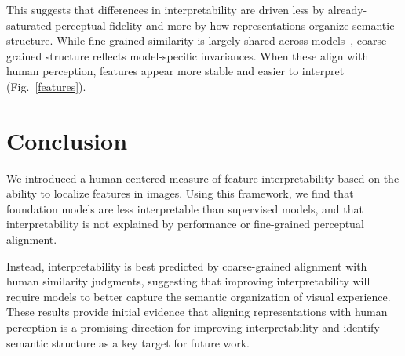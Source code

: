 \documentclass{ccn}
\begin{document}
This suggests that differences in interpretability are driven less by already-saturated perceptual fidelity and more by how representations organize semantic structure. While fine-grained similarity is largely shared across models~\citep{groger2026aristotelian}, coarse-grained structure reflects model-specific invariances. When these align with human perception, features appear more stable and easier to interpret (Fig.~\ref{features}).

\section{Conclusion}

We introduced a human-centered measure of feature interpretability based on the ability to localize features in images. Using this framework, we find that foundation models are less interpretable than supervised models, and that interpretability is not explained by performance or fine-grained perceptual alignment.

Instead, interpretability is best predicted by coarse-grained alignment with human similarity judgments, suggesting that improving interpretability will require models to better capture the semantic organization of visual experience. These results provide initial evidence that aligning representations with human perception is a promising direction for improving interpretability and identify semantic structure as a key target for future work.


\newpage
\printbibliography
\end{document}
